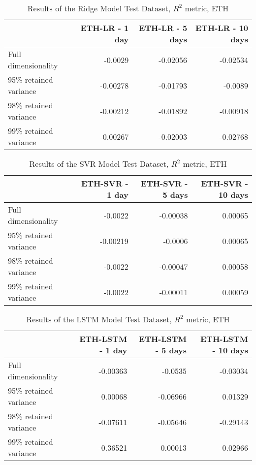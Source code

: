     \begin{table}[htbp]
        \centering
        \caption{Results of the Ridge Model Test Dataset, $R^2$ metric, ETH}
    \begin{tabular}{lrrr}
        \toprule
        {} &  ETH-LR - 1 day &  ETH-LR - 5 days &  ETH-LR - 10 days\\
        \midrule
        Full dimensionality   &   -0.0029   &    -0.02056   &    -0.02534    \\
        95\% retained variance &   -0.00278  &    -0.01793    &     -0.0089   \\
        98\% retained variance &    -0.00212    &     -0.01892    &    -0.00918  \\
        99\% retained variance &     -0.00267  &    -0.02003   &    -0.02768   \\
        \bottomrule
        \end{tabular}
    \end{table}
    
    \begin{table}[htbp]
        \centering
        \caption{Results of the SVR Model Test Dataset, $R^2$ metric, ETH}
    \begin{tabular}{lrrr}
        \toprule
        {} &  ETH-SVR - 1 day &  ETH-SVR - 5 days &  ETH-SVR - 10 days\\
        \midrule
        Full dimensionality     & -0.0022 &    -0.00038    &    0.00065     \\
        95\% retained variance   & -0.00219 &    -0.0006   &     0.00065   \\
        98\% retained variance   & -0.0022  &      -0.00047   &     0.00058     \\
        99\% retained variance   &  -0.0022 &      -0.00011   &    0.00059    \\
        \bottomrule
    \end{tabular}
    \end{table}
    
    \begin{table}[htbp]
        \centering
        \caption{Results of the LSTM Model Test Dataset, $R^2$ metric, ETH}
    \begin{tabular}{lrrr}
        \toprule
        {} &  ETH-LSTM - 1 day &  ETH-LSTM - 5 days &  ETH-LSTM - 10 days \\
        \midrule
        Full dimensionality   &   -0.00363    &     -0.0535      &    -0.03034       \\
        95\% retained variance &  0.00068     &     -0.06966      &     0.01329      \\
        98\% retained variance &   -0.07611    &  -0.05646        &     -0.29143       \\
        99\% retained variance &  -0.36521    &    0.00013   &      -0.02966     \\
        \bottomrule
    \end{tabular}
    \end{table}
    

